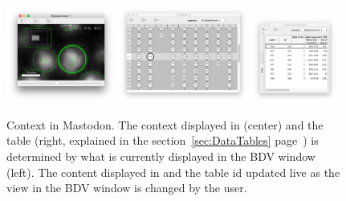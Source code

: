 \begin{figure}
    \null\hfill
    \includegraphics[width=0.32\textwidth]{figures/Mastodon_Context1.png}
    \hfill
    \includegraphics[width=0.38\textwidth]{figures/Mastodon_Context2.png}
    \hfill
    \includegraphics[width=0.25\textwidth]{figures/Mastodon_Context3.png}
    \hfill\null
    
    \caption{Context in Mastodon. The context displayed in \TrackScheme (center) and the table (right, explained in the section~\ref{sec:DataTables} page~\pageref{sec:DataTables}) is determined by what is currently displayed in the BDV window (left). The content displayed in \TrackScheme and the table id updated live as the view in the BDV window is changed by the user. }
    \label{fig:SpatialContext}
\end{figure}